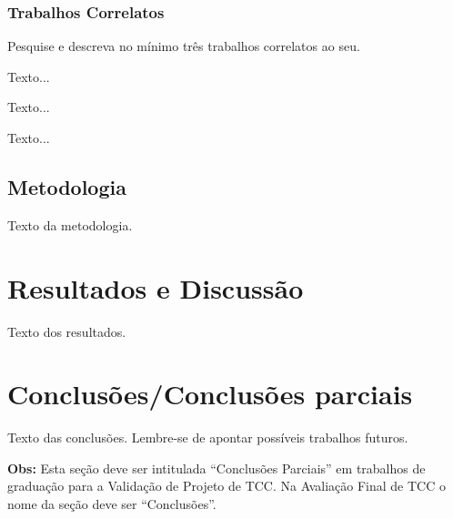 \documentclass[
	article,
	11pt,
	oneside,
	a4paper,
	chapter=TITLE,
	section=TITLE,
	english,
	brazil,
	sumario=tradicional
]{abntex2}
\begin{document}
     
     \subsubsection{Trabalhos Correlatos}
     
     Pesquise e descreva no mínimo três trabalhos correlatos ao seu.
     
     
     Texto...
     
     
     Texto...
     
     
     Texto...
     
     
     \subsection{Metodologia}
     
     Texto da metodologia.
     
     
     
     
     

	\section{Resultados e Discussão}
    	
     Texto dos resultados.
     
     
     

	\section{Conclusões/Conclusões parciais}
	
	Texto das conclusões. Lembre-se de apontar possíveis trabalhos futuros.
	
	\textbf{Obs:} Esta seção deve ser intitulada ``Conclusões Parciais'' em trabalhos de graduação para a Validação de Projeto de TCC. Na Avaliação Final de TCC o nome da seção deve ser ``Conclusões''.
    
    
    
\end{document}
